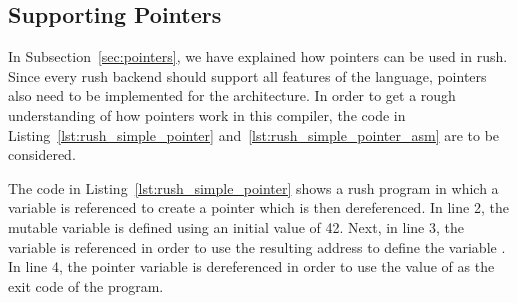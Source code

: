 \subsection{Supporting Pointers}

In Subsection~\ref{sec:pointers}, we have explained how pointers can be used in rush.
Since every rush backend should support all features of the language, pointers also need to be implemented for the \riscv{} architecture.
In order to get a rough understanding of how pointers work in this compiler, the code in Listing~\ref{lst:rush_simple_pointer} and~\ref{lst:rush_simple_pointer_asm} are to be considered.

\begin{minipage}{.34\textwidth}
	\center
\end{minipage}%
\hspace{3cm}
\begin{minipage}{.45\textwidth}
	\center
\end{minipage}


The code in Listing~\ref{lst:rush_simple_pointer} shows a rush program in which a variable is referenced to create a pointer which is then dereferenced.
In line 2, the mutable variable  is defined using an initial value of 42.
Next, in line 3, the variable is referenced in order to use the resulting address to define the variable .
In line 4, the  pointer variable is dereferenced in order to use the value of  as the exit code of the program.


